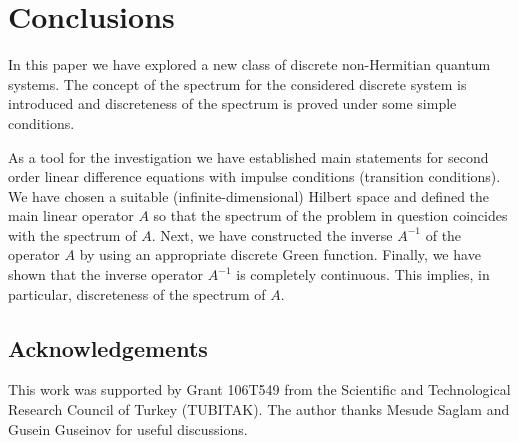 \documentclass[pdftex]{sigma}
\numberwithin{equation}{section}
\begin{document}
\section{Conclusions}\label{section8}

In this paper we have explored a new class of discrete non-Hermitian quantum
systems. The concept of the spectrum for the considered discrete system is
introduced and discreteness of the spectrum is proved under some simple
conditions.

As a tool for the investigation we have established main statements for
second order linear dif\/ference equations with impulse conditions (transition
conditions). We have chosen a suitable (inf\/inite-dimensional) Hilbert space
and def\/ined the main linear operator $A$ so that the spectrum of the problem
in question coincides with the spectrum of $A.$ Next, we have constructed
the inverse $A^{-1}$ of the operator $A$ by using an appropriate discrete
Green function. Finally, we have shown that the inverse operator $A^{-1}$ is
completely continuous. This implies, in particular, discreteness of the
spectrum of $A.$

\subsection*{Acknowledgements}

This work was supported by Grant 106T549 from the Scientif\/ic and
Technological Research Council of Turkey (TUBITAK). The author thanks Mesude
Saglam and Gusein Guseinov for useful discussions.
\end{document}
